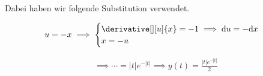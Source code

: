 \begin{solution}
\begin{enumerate}[label = \arabic*.]
    Dabei haben wir folgende Substitution verwendet.

    \begin{align*}
        u = -x
        \implies
        \begin{cases}
            \derivative[][u]{x} = -1 \implies \mathrm{d} u = - \mathrm{d} x \\
            x = -u
        \end{cases}
    \end{align*}

\end{enumerate}

\begin{align*}
    \implies
    \cdots = |t| e^{-|t|}
    \implies
    y(t) = \frac{|t| e^{-|t|}}{2}
\end{align*}

\end{solution}

